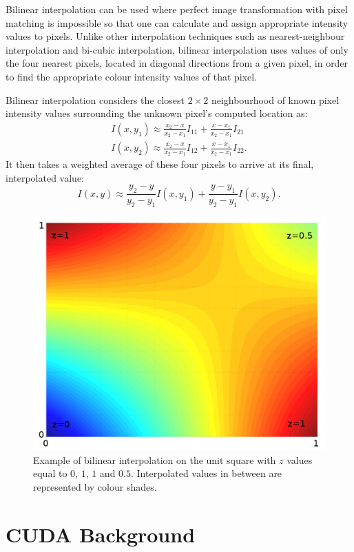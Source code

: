 \documentclass[12pt]{article}
\newcommand*{\Cuda}{\textsc{CUDA}}
\begin{document}
Bilinear interpolation can be used where perfect image transformation with pixel matching is impossible so that one can calculate and assign appropriate intensity values to pixels. Unlike other interpolation techniques such as nearest-neighbour interpolation and bi-cubic interpolation, bilinear interpolation uses values of only the four nearest pixels, located in diagonal directions from a given pixel, in order to find the appropriate colour intensity values of that pixel.

Bilinear interpolation considers the closest $2 \times 2$ neighbourhood of known pixel intensity values surrounding the unknown pixel's computed location as:
%
\begin{equation}
  \begin{aligned}
  I(x,y_{1})\approx {\frac {x_{2}-x}{x_{2}-x_{1}}}I_{11}+{\frac {x-x_{1}}{x_{2}-x_{1}}}I_{21} \\
  I(x,y_{2})\approx {\frac {x_{2}-x}{x_{2}-x_{1}}}I_{12}+{\frac {x-x_{1}}{x_{2}-x_{1}}}I_{22}.
  \end{aligned}
\end{equation}
%
It then takes a weighted average of these four pixels to arrive at its final, interpolated value:
\begin{equation}
  I(x,y)\approx {\frac {y_{2}-y}{y_{2}-y_{1}}}I(x,y_{1})+{\frac {y-y_{1}}{y_{2}-y_{1}}}I(x,y_{2}).
\end{equation}
%
\begin{figure}[h!]
	\centering
	\includegraphics[width=0.4\linewidth]{figures/bilininterp}
	\caption{Example of bilinear interpolation on the unit square with $z$ values equal to $0$, $1$, $1$ and $0.5$. Interpolated values in between are represented by colour shades.}
	\label{fig:bilininterp}
\end{figure}
%
\section{\Cuda{} Background}
%
\end{document}
